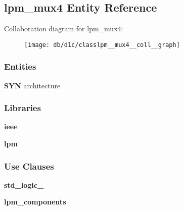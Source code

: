 \subsection{lpm\+\_\+mux4 Entity Reference}
\label{classlpm__mux4}


Collaboration diagram for lpm\+\_\+mux4\+:\nopagebreak
\begin{figure}[H]
\begin{center}
\leavevmode
\texttt{[image: db/d1c/classlpm\_\_mux4\_\_coll\_\_graph]}
\end{center}
\end{figure}
\subsubsection*{Entities}
\begin{DoxyCompactItemize}
\item 
{\bf S\+YN} architecture
\end{DoxyCompactItemize}
\subsubsection*{Libraries}
 \begin{DoxyCompactItemize}
\item 
{\bf ieee} 
\item 
{\bf lpm} 
\end{DoxyCompactItemize}
\subsubsection*{Use Clauses}
 \begin{DoxyCompactItemize}
\item 
{\bf std\+\_\+logic\+\_}   
\item 
{\bf lpm\+\_\+components}   
\end{DoxyCompactItemize}
